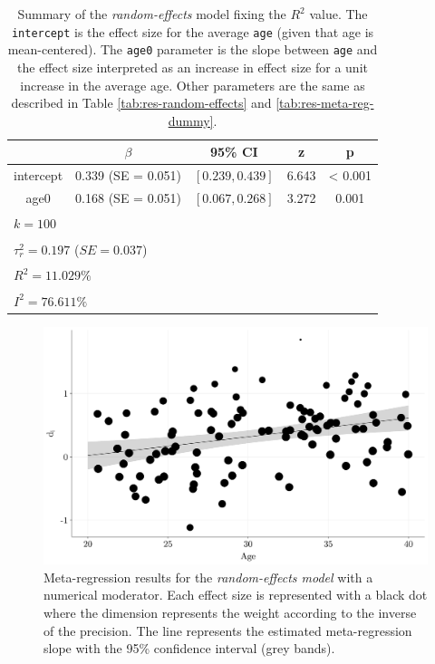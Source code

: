 \documentclass[
  man,floatsintext]{apa6}
\begin{document}
\normalsize

\scriptsize

\begin{table}[H]

\caption{\label{tab:res-meta-reg-numerical-r2}\color{red} Summary of the \emph{random-effects} model fixing the \(R^{2}\) value. The \texttt{intercept} is the effect size for the average \texttt{age} (given that age is mean-centered). The \texttt{age0} parameter is the slope between \texttt{age} and the effect size interpreted as an increase in effect size for a unit increase in the average age. Other parameters are the same as described in Table \ref{tab:res-random-effects} and \ref{tab:res-meta-reg-dummy}. \color{black}}
\centering
\fontsize{9}{11}\selectfont
\begin{tabular}[t]{ccccc}
\toprule
 & $\beta$ & 95\% CI & z & p\\
\midrule
intercept & 0.339 (SE = 0.051) & $[0.239, 0.439]$ & 6.643 & < 0.001\\
age0 & 0.168 (SE = 0.051) & $[0.067, 0.268]$ & 3.272 & 0.001\\
\bottomrule
\multicolumn{5}{l}{\textsuperscript{} $k = 100$}\\
\multicolumn{5}{l}{\textsuperscript{} $\tau^2_r = 0.197$ ($SE = 0.037$)}\\
\multicolumn{5}{l}{\textsuperscript{} $R^2 = 11.029\%$}\\
\multicolumn{5}{l}{\textsuperscript{} $I^2 = 76.611\%$}\\
\end{tabular}
\end{table}

\normalsize

\scriptsize

\begin{figure}[H]

{\centering \includegraphics[width=0.8\linewidth]{paper_files/figure-latex/plot-meta-reg-numerical-r2-1} 

}

\caption{Meta-regression results for the \emph{random-effects model} with a numerical moderator. Each effect size is represented with a black dot where the dimension represents the weight according to the inverse of the precision. The line represents the estimated meta-regression slope with the 95\% confidence interval (grey bands).}\label{fig:plot-meta-reg-numerical-r2}
\end{figure}
\end{document}

